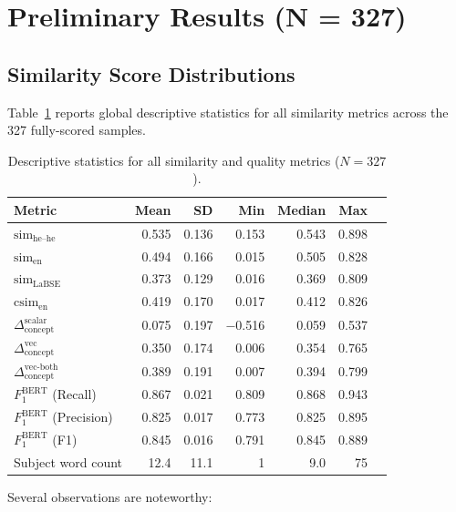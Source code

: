 \documentclass[12pt,a4paper]{article}
\newcommand{\simEN}{\ensuremath{\mathrm{sim}_{\text{en}}}}
\newcommand{\simHH}{\ensuremath{\mathrm{sim}_{\text{he--he}}}}
\newcommand{\simLaBSE}{\ensuremath{\mathrm{sim}_{\text{LaBSE}}}}
\newcommand{\csim}{\ensuremath{\mathrm{csim}_{\text{en}}}}
\newcommand{\SACs}{\ensuremath{\Delta_{\text{concept}}^{\text{scalar}}}}
\newcommand{\SACv}{\ensuremath{\Delta_{\text{concept}}^{\text{vec}}}}
\newcommand{\SACvb}{\ensuremath{\Delta_{\text{concept}}^{\text{vec-both}}}}
\newcommand{\bsF}{\ensuremath{F_1^{\text{BERT}}}}
\begin{document}
\section{Preliminary Results (N = 327)}

\subsection{Similarity Score Distributions}

Table~\ref{tab:global_stats} reports global descriptive statistics for all similarity
metrics across the 327 fully-scored samples.

\begin{table}[H]
\centering
\caption{Descriptive statistics for all similarity and quality metrics ($N=327$).}
\label{tab:global_stats}
\small
\begin{tabular}{lrrrrrr}
\toprule
\textbf{Metric} & \textbf{Mean} & \textbf{SD} & \textbf{Min} & \textbf{Median} & \textbf{Max} \\
\midrule
\simHH{}         & 0.535 & 0.136 & 0.153 & 0.543 & 0.898 \\
\simEN{}         & 0.494 & 0.166 & 0.015 & 0.505 & 0.828 \\
\simLaBSE{}      & 0.373 & 0.129 & 0.016 & 0.369 & 0.809 \\
\csim{}          & 0.419 & 0.170 & 0.017 & 0.412 & 0.826 \\
\SACs{}          & 0.075 & 0.197 & $-$0.516 & 0.059 & 0.537 \\
\SACv{}          & 0.350 & 0.174 & 0.006 & 0.354 & 0.765 \\
\SACvb{}         & 0.389 & 0.191 & 0.007 & 0.394 & 0.799 \\
\bsF{} (Recall)  & 0.867 & 0.021 & 0.809 & 0.868 & 0.943 \\
\bsF{} (Precision) & 0.825 & 0.017 & 0.773 & 0.825 & 0.895 \\
\bsF{} (F1)      & 0.845 & 0.016 & 0.791 & 0.845 & 0.889 \\
Subject word count & 12.4 & 11.1 & 1 & 9.0 & 75 \\
\bottomrule
\end{tabular}
\end{table}

Several observations are noteworthy:
\end{document}
